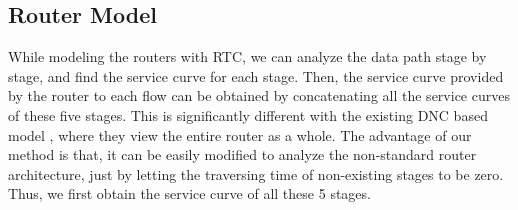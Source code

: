 \documentclass[10pt,journal]{IEEEtran}
\begin{document}
\subsection{Router Model}\label{router}
While modeling the routers with RTC, we can analyze the data path stage by stage, and find the service curve for each stage. Then, the service curve provided by the router to each flow can be obtained by concatenating all the service curves of these five stages. This is significantly different with the existing DNC based model \cite{Qian2010Analysis,Qian489900}, where they view the entire router as a whole. The advantage of our method is that, it can be easily modified to analyze the non-standard router architecture, just by letting the traversing time of non-existing stages to be zero. Thus, we first obtain the service curve of all these 5 stages.
\begin{figure}
  \centering
  \hspace{10pt}

\end{figure}
\end{document}
